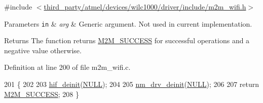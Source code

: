 {\ttfamily \#include $<$\hyperlink{m2m__wifi_8h}{third\+\_\+party/atmel/devices/wilc1000/driver/include/m2m\+\_\+wifi.\+h}$>$}


\begin{DoxyParams}[1]{Parameters}
\mbox{\tt in}  & {\em arg} & Generic argument. Not used in current implementation. \\
\hline
\end{DoxyParams}
\begin{DoxyReturn}{Returns}
The function returns \hyperlink{nm__common_8h_a9ef27ba27aafdd1aa3a79d3ba2c36b8f}{M2\+M\+\_\+\+S\+U\+C\+C\+E\+SS} for successful operations and a negative value otherwise. 
\end{DoxyReturn}


Definition at line 200 of file m2m\+\_\+wifi.\+c.


\begin{DoxyCode}
201 \{
202 
203     \hyperlink{m2m__hif_8c_a297b5d8edbc7f34eedb4992bf20b16ab}{hif\_deinit}(\hyperlink{group__BSPDefine_ga070d2ce7b6bb7e5c05602aa8c308d0c4}{NULL});
204 
205     \hyperlink{nmdrv_8c_a444c8058e44c2381fcceac93a5f53a3c}{nm\_drv\_deinit}(\hyperlink{group__BSPDefine_ga070d2ce7b6bb7e5c05602aa8c308d0c4}{NULL});
206 
207     \textcolor{keywordflow}{return} \hyperlink{nm__common_8h_a9ef27ba27aafdd1aa3a79d3ba2c36b8f}{M2M\_SUCCESS};
208 \}
\end{DoxyCode}
